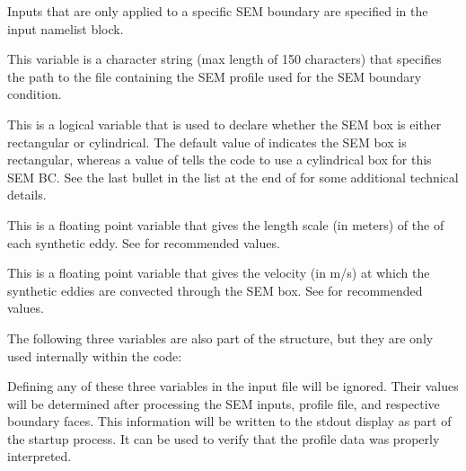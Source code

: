 Inputs that are only applied to a specific SEM boundary are
specified in the  input namelist block.
%
\begin{InputList}
%
  \item[{\BCinpBC[nmlBC::BCInput/SEM/ProfileFile]{SEM\%Profile\_File}}]
    This variable is a character string (max length of 150 characters) that
    specifies the path to the file containing the SEM profile used for the SEM
    boundary condition.
%
  \item[{\BCinpBC[nmlBC::BCInput/SEM/IsCylindrical]{SEM\%Is\_Cylindrical}}]
    This is a logical variable that is used to declare whether the SEM box is
    either rectangular or cylindrical. The default value of \fls{} indicates the
    SEM box is rectangular, whereas a value of \tru{} tells the code to use a
    cylindrical box for this SEM BC. See the last bullet in the list at the end
    of  for some additional technical
    details.
%
  \item[{\BCinpBC[nmlBC::BCInput/SEM/LengthScale]{SEM\%Length\_Scale}}]
    This is a floating point variable that gives the length scale (in meters) of
    the  of each synthetic eddy. See
     for recommended values.
%
  \item[{\BCinpBC[nmlBC::BCInput/SEM/ConvectiveVelocity]%
                 {SEM\%Convective\_Velocity}}]
    This is a floating point variable that gives the velocity (in m\slash{}s) at
    which the synthetic eddies are convected through the SEM box. See
     for recommended values.
%
\end{InputList}

The following three variables are also part of the 
structure, but they are only used internally within the code:
%
\begin{InputExample}
  \item[{\BCinpBC[nmlBC::BCInput/SEM/ProfileHeight]{SEM\%Profile\_Height}}]
  \item[{\BCinpBC[nmlBC::BCInput/SEM/SubInBCGrp]{SEM\%Sub\_In\_BC\_Grp}}]
  \item[{\BCinpBC[nmlBC::BCInput/SEM/SubInBCIdx]{SEM\%Sub\_In\_BC\_Idx}}]
\end{InputExample}
%
Defining any of these three variables in the input file will be ignored.
%
Their values will be determined after processing the SEM inputs, profile file,
and respective boundary faces.
%
This information will be written to the stdout display as part of the
startup process.
%
It can be used to verify that the profile data was
properly interpreted.

